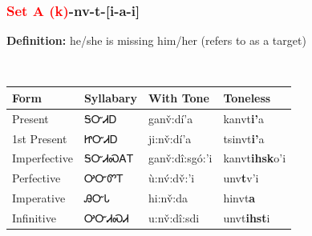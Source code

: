 \subsubsection*{\textcolor{Red}{Set A (k)}{-}\textbf{nv}{-}t{-}[i-a-i]}
\nopagebreak
\textbf{Definition: } he/she is missing him/her (refers to as a target)
\\[0.5em]
\begin{tabularx}{\textwidth}{l X X X}%
\toprule%
\textbf{Form}&\textbf{Syllabary}&\textbf{With Tone}&\textbf{Toneless}\\%
\midrule%
Present&ᎦᏅᏗᎠ&ganv̌:dí’a&kanvt\textbf{i'}a\\%
1st Present&ᏥᏅᏗᎠ&ji:nv̌:dí’a&tsinvt\textbf{i'}a\\%
Imperfective&ᎦᏅᏗᏍᎪᎢ&ganv̌:dî:sgó:’i&kanvt\textbf{ihsk}o'i\\%
Perfective&ᎤᏅᏛᎢ&ù:nv́:dv̌:’i&unv\textbf{t}v'i\\%
Imperative&ᎯᏅᏓ&hi:nv̌:da&hinvt\textbf{a}\\%
Infinitive&ᎤᏅᏗᏍᏗ&u:nv̌:dî:sdi&unvt\textbf{ihst}i\\%
\bottomrule%
\end{tabularx}
\\[1em]